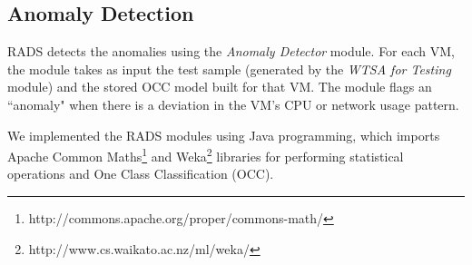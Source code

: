 \subsection{Anomaly Detection}
\noindent RADS detects the anomalies using the \textit{Anomaly Detector} module. For each VM, the module takes as input the test sample (generated by the \textit{WTSA for Testing} module) and the stored OCC model built for that VM. The module flags an ``anomaly" when there is a deviation in the VM's CPU or network usage pattern. 

We implemented the RADS modules using Java programming, which imports Apache Common Maths\footnote{http://commons.apache.org/proper/commons-math/} and Weka\footnote{http://www.cs.waikato.ac.nz/ml/weka/} libraries for performing statistical operations and One Class Classification (OCC). 


